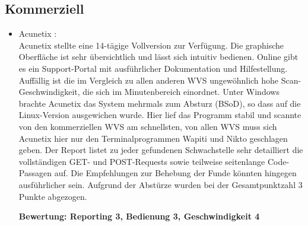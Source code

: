 \documentclass[12pt,oneside,a4paper,parskip]{scrbook}
\begin{document}
    \subsection{Kommerziell}
      \begin{itemize}
        \item Acunetix \cite{Acunetix}:\\
          Acunetix stellte eine 14-tägige Vollversion zur Verfügung. Die graphische Oberfläche ist sehr übersichtlich und lässt sich intuitiv bedienen. Online gibt es ein Support-Portal mit ausführlicher Dokumentation und Hilfestellung.
          Auffällig ist die im Vergleich zu allen anderen WVS ungewöhnlich hohe Scan-Geschwindigkeit, die sich im Minutenbereich einordnet.
          Unter Windows brachte Acunetix das System mehrmals zum Absturz (BSoD), so dass auf die Linux-Version ausgewichen wurde. Hier lief das Programm stabil und scannte von den kommerziellen WVS am schnellsten, von allen WVS muss sich Acunetix hier nur den Terminalprogrammen Wapiti und Nikto geschlagen geben. Der Report listet zu jeder gefundenen Schwachstelle sehr detailliert die vollständigen GET- und POST-Requests sowie teilweise seitenlange Code-Passagen auf. Die Empfehlungen zur Behebung der Funde könnten hingegen ausführlicher sein. Aufgrund der Abstürze wurden bei der Gesamtpunktzahl 3 Punkte abgezogen.

          \textbf{Bewertung: Reporting 3, Bedienung 3, Geschwindigkeit 4}\\


\end{itemize}
\end{document}
